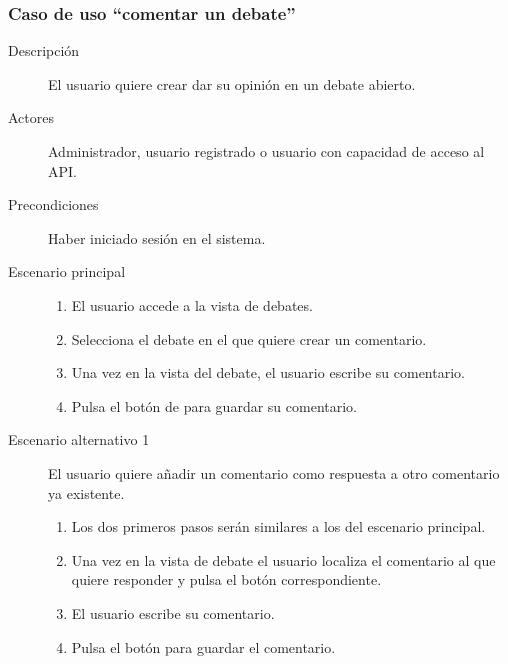 \subsubsection{Caso de uso ``comentar un debate''}
\begin{description}
\item[Descripción] El usuario quiere crear dar su opinión en un debate abierto.
\item[Actores] Administrador, usuario registrado o usuario con capacidad de acceso al API.
\item[Precondiciones] Haber iniciado sesión en el sistema.
\item[Escenario principal] \hfill
						 	\begin{enumerate}
							\item El usuario accede a la vista de debates.
							\item Selecciona el debate en el que quiere crear un comentario.
							\item Una vez en la vista del debate, el usuario escribe su comentario.
							\item Pulsa el botón de para guardar su comentario.
							\end{enumerate}
\item[Escenario alternativo 1] El usuario quiere añadir un comentario como respuesta a otro comentario ya existente.
							\begin{enumerate}
							\item Los dos primeros pasos serán similares a los del escenario principal.
							\item Una vez en la vista de debate el usuario localiza el comentario al que quiere responder y pulsa el botón correspondiente.
							\item El usuario escribe su comentario.
							\item Pulsa el botón para guardar el comentario.
							\end{enumerate}
\end{description}


